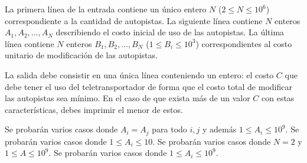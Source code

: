 \documentclass{oci}
\begin{document}
\begin{inputDescription}
  La primera línea de la entrada contiene un único entero $N$ ($2 \leq N \leq
  10^6$) correspondiente a la cantidad de autopistas.
  La siguiente línea contiene $N$ enteros $A_1, A_2, \ldots, A_N$ describiendo el
  costo inicial de uso de las autopistas.
  La última línea contiene $N$ enteros $B_1, B_2, \ldots, B_N$ ($1 \leq B_i \leq
  10^3$) correspondientes al costo unitario de modificación de las autopistas.
\end{inputDescription}

\begin{outputDescription}
  La salida debe consistir en una única línea conteniendo un entero: el costo
  $C$ que debe tener el uso del teletransportador de forma que el costo total de
  modificar las autopistas sea mínimo.
  En el caso de que exista más de un valor $C$ con estas características, debes
  imprimir el menor de estos.
\end{outputDescription}

\begin{scoreDescription}
   Se probarán varios casos donde $A_i=A_j$ para todo $i,j$ y además
  $1 \leq A_i \leq 10^9$.
   Se probarán varios casos donde $1 \leq A_i \leq 10$.
   Se probarán varios casos donde $N=2$ y $1\leq A \leq 10^9$.
   Se probarán varios casos donde $1\leq A_i\leq 10^9$.
\end{scoreDescription}

\begin{sampleDescription}
\end{sampleDescription}
\end{document}
